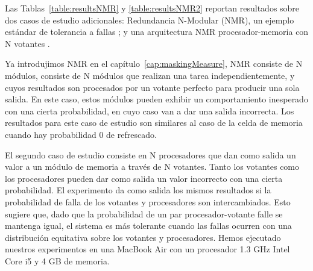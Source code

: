 Las Tablas~\ref{table:resultsNMR} y \ref{table:resultsNMR2} reportan resultados sobre dos casos de estudio adicionales: Redundancia N-Modular (NMR), un ejemplo estándar de tolerancia a fallas \cite{ShoomanBook}; y una arquitectura NMR procesador-memoria con N votantes \cite{KrishnaBook}.

Ya introdujimos NMR en el capítulo~\ref{cap:maskingMeasure}, NMR consiste de N módulos, consiste de N módulos que realizan una tarea independientemente, y cuyos resultados son procesados por un votante perfecto para producir una sola salida.
En este caso, estos módulos pueden exhibir un comportamiento inesperado con una cierta probabilidad, en cuyo caso van a dar una salida incorrecta. Los resultados para este caso de estudio son similares al caso de la celda de memoria cuando hay probabilidad $0$ de refrescado. 

El segundo caso de estudio consiste en N procesadores que dan como salida un valor a un módulo de memoria a través de N votantes. Tanto los votantes como los procesadores pueden dar como salida un valor incorrecto con una cierta probabilidad.
El experimento da como salida los mismos resultados si la probabilidad de falla de los votantes y procesadores son intercambiados. Esto sugiere que, dado que la probabilidad de un par procesador-votante falle se mantenga igual, el sistema es más tolerante cuando las fallas ocurren con una distribución equitativa sobre los votantes y procesadores.
Hemos ejecutado nuestros experimentos en una MacBook Air con un procesador 1.3 GHz Intel Core i5 y 
4 GB de memoria.


